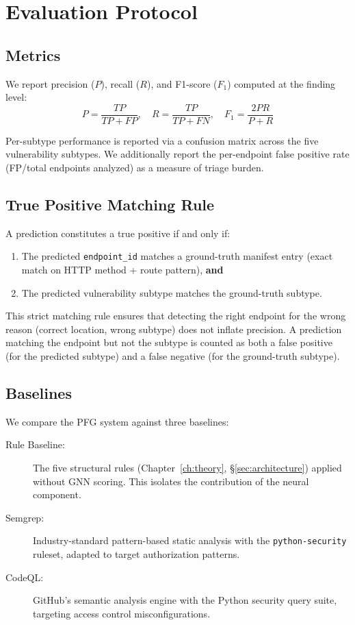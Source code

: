 \section{Evaluation Protocol}
\label{sec:protocol}

\subsection{Metrics}

We report precision ($P$), recall ($R$), and F1-score ($F_1$) computed at the finding level:
\begin{equation}
P = \frac{TP}{TP + FP}, \quad R = \frac{TP}{TP + FN}, \quad F_1 = \frac{2PR}{P + R}
\end{equation}

Per-subtype performance is reported via a confusion matrix across the five vulnerability subtypes. We additionally report the per-endpoint false positive rate (FP/total endpoints analyzed) as a measure of triage burden.

\subsection{True Positive Matching Rule}

A prediction constitutes a true positive if and only if:
\begin{enumerate}
    \item The predicted \texttt{endpoint\_id} matches a ground-truth manifest entry (exact match on HTTP method + route pattern), \textbf{and}
    \item The predicted vulnerability subtype matches the ground-truth subtype.
\end{enumerate}

This strict matching rule ensures that detecting the right endpoint for the wrong reason (correct location, wrong subtype) does not inflate precision. A prediction matching the endpoint but not the subtype is counted as both a false positive (for the predicted subtype) and a false negative (for the ground-truth subtype).

\subsection{Baselines}

We compare the PFG system against three baselines:

\begin{description}
    \item[Rule Baseline:] The five structural rules (Chapter~\ref{ch:theory}, \S\ref{sec:architecture}) applied without GNN scoring. This isolates the contribution of the neural component.
    \item[Semgrep:] Industry-standard pattern-based static analysis with the \texttt{python-security} ruleset, adapted to target authorization patterns.
    \item[CodeQL:] GitHub's semantic analysis engine with the Python security query suite, targeting access control misconfigurations.
\end{description}

